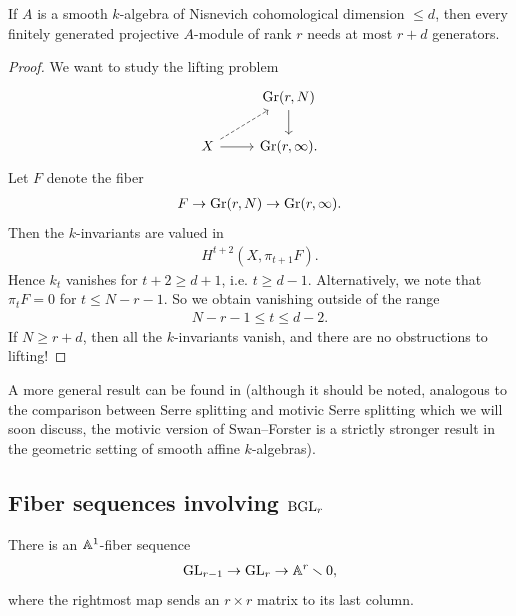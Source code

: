 \documentclass[11pt,openany]{book}
\begin{document}
\begin{theorem}
\label{thm:motivic-Swan-Forster} 
If $A$ is a smooth $k$-algebra of Nisnevich cohomological dimension $\le d$, then every finitely generated projective $A$-module of rank $r$ needs at most $r+d$ generators.
\end{theorem}
\begin{proof} We want to study the lifting problem
\[ \begin{tikzcd}
     & {\Gr(r,N)}\dar\\
    X\rar\ar[ur,dashed] & {\Gr(r,\infty).}
\end{tikzcd} \]
Let $F$ denote the fiber
\begin{align*}
    F \to \mathrm{Gr}(r,N) \to \mathrm{Gr}(r,\infty).
\end{align*}
Then the $k$-invariants are valued in
\begin{align*}
    H^{t+2}(X, \pi_{t+1}F).
\end{align*}
Hence $k_t$ vanishes for $t+2 \ge d+1$, i.e. $t\ge d-1$. Alternatively, we note that $\pi_t F = 0$ for $t \le N-r-1$. So we obtain vanishing outside of the range
\begin{align*}
    N-r-1 \le t \le d-2.
\end{align*}
If $N \ge r+d$, then all the $k$-invariants vanish, and there are no obstructions to lifting!
\end{proof}

\begin{remark} A more general result can be found in \cite{Swan-gens} (although it should be noted, analogous to the comparison between Serre splitting and motivic Serre splitting which we will soon discuss, the motivic version of Swan--Forster is a strictly stronger result in the geometric setting of smooth affine $k$-algebras).
\end{remark}



\subsection{Fiber sequences involving $\mathrm{BGL}_r$}

\begin{proposition} There is an $\mathbb{A}^1$-fiber sequence
\begin{align*}
    \mathrm{GL}_{r-1} \to \mathrm{GL}_r \to \mathbb{A}^r\smallsetminus 0,
\end{align*}
where the rightmost map sends an $r \times r$ matrix to its last column.
\end{proposition}
\end{document}
